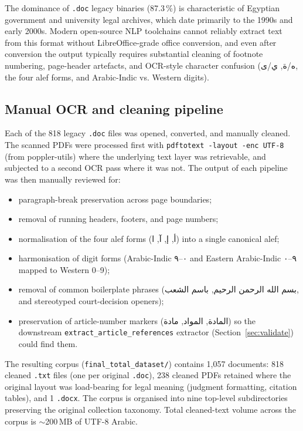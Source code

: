 \documentclass[final,1p,times]{elsarticle}
\newcommand{\ar}[1]{{\arabicfont\beginR #1\endR}}
\begin{document}
The dominance of \texttt{.doc} legacy binaries (87.3\,\%) is characteristic
of Egyptian government and university legal archives, which date primarily to
the 1990s and early 2000s. Modern open-source NLP toolchains cannot reliably
extract text from this format without LibreOffice-grade office conversion,
and even after conversion the output typically requires substantial cleaning
of footnote numbering, page-header artefacts, and OCR-style character
confusion (\ar{ه}/\ar{ة}, \ar{ي}/\ar{ى}, the four alef forms, and
Arabic-Indic vs. Western digits).

\subsection{Manual OCR and cleaning pipeline}

Each of the 818 legacy \texttt{.doc} files was opened, converted, and
manually cleaned. The scanned PDFs were processed first with
\texttt{pdftotext -layout -enc UTF-8} (from poppler-utils) where the
underlying text layer was retrievable, and subjected to a second OCR pass
where it was not. The output of each pipeline was then manually reviewed for:
\begin{itemize}
  \item paragraph-break preservation across page boundaries;
  \item removal of running headers, footers, and page numbers;
  \item normalisation of the four alef forms (\ar{أ}, \ar{إ}, \ar{آ},
        \ar{ا}) into a single canonical alef;
  \item harmonisation of digit forms (Arabic-Indic \ar{٠}--\ar{٩} and
        Eastern Arabic-Indic \ar{۰}--\ar{۹} mapped to Western 0--9);
  \item removal of common boilerplate phrases
        (\ar{بسم الله الرحمن الرحيم}, \ar{باسم الشعب},
        and stereotyped court-decision openers);
  \item preservation of article-number markers
        (\ar{المادة}, \ar{المواد}, \ar{مادة}) so the downstream
        \texttt{extract\_article\_references} extractor (Section~\ref{sec:validate})
        could find them.
\end{itemize}

The resulting corpus (\texttt{final\_total\_dataset/}) contains 1{,}057
documents: 818 cleaned \texttt{.txt} files (one per original \texttt{.doc}),
238 cleaned PDFs retained where the original layout was load-bearing for
legal meaning (judgment formatting, citation tables), and 1 \texttt{.docx}.
The corpus is organised into nine top-level subdirectories preserving the
original collection taxonomy. Total cleaned-text volume across the corpus is
$\sim$200\,MB of UTF-8 Arabic.
\end{document}
